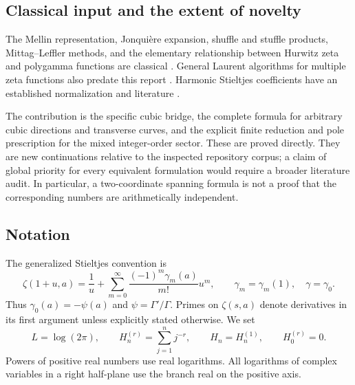 \subsection{Classical input and the extent of novelty}

The Mellin representation, Jonqui\`ere expansion, shuffle and stuffle
products, Mittag--Leffler methods, and the elementary relationship
between Hurwitz zeta and polygamma functions are classical
\cite{DLMFpolylog,DLMFhurwitz,DLMFgamma,Connon,BorweinDilcher}.
General Laurent algorithms for multiple zeta functions also predate
this report \cite{MOW}. Harmonic Stieltjes coefficients have an
established normalization and literature \cite{Kargin}.

The contribution is the specific cubic bridge, the complete formula
for arbitrary cubic directions and transverse curves, and the explicit
finite reduction and pole prescription for the mixed integer-order
sector. These are proved directly. They are new continuations relative
to the inspected repository corpus; a claim of global priority for
every equivalent formulation would require a broader literature audit.
In particular, a two-coordinate spanning formula is not a proof that
the corresponding numbers are arithmetically independent.

\subsection{Notation}

The generalized Stieltjes convention is
\begin{equation}\label{eq:stieltjes}
 \zeta(1+u,a)=\frac1u+
       \sum_{m=0}^{\infty}\frac{(-1)^m\gamma_m(a)}{m!}u^m,
 \qquad \gamma_m=\gamma_m(1),\quad \gamma=\gamma_0.
\end{equation}
Thus $\gamma_0(a)=-\psi(a)$ and $\psi=\Gamma'/\Gamma$.
Primes on $\zeta(s,a)$ denote derivatives in its first argument unless
explicitly stated otherwise. We set
\[
 L=\log(2\pi),\qquad
 H_n^{(r)}=\sum_{j=1}^n j^{-r},\qquad H_n=H_n^{(1)},\qquad H_0^{(r)}=0.
\]
Powers of positive real numbers use real logarithms. All logarithms
of complex variables in a right half-plane use the branch real on
the positive axis.

